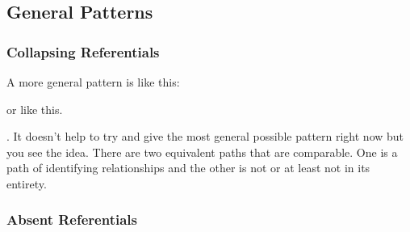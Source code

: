 \subsection{General Patterns}
\subsubsection{Collapsing Referentials}
A more general pattern is like this:

or like this.

. It doesn't help to try and give the most general possible pattern right now but you see the idea. There are two equivalent paths that are comparable. One is a path of identifying relationships and the other is not or at least not in its entirety.
\subsubsection{Absent Referentials}
 

